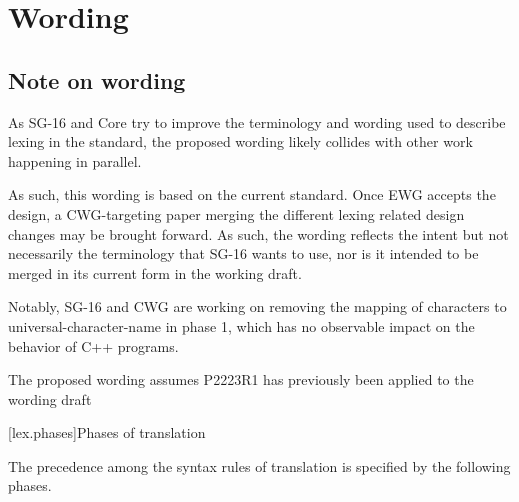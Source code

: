 \documentclass{wg21}
\begin{document}
\section{Wording}

\subsection{Note on wording}

As SG-16 and Core try to improve the terminology and wording used to describe lexing in the standard,
the proposed wording likely collides with other work happening in parallel.

As such, this wording is based on the current standard.
Once EWG accepts the design, a CWG-targeting paper merging the different lexing related design changes may be brought forward.
As such, the wording reflects the intent but not necessarily the terminology that SG-16 wants to use, nor is it intended to be merged in its current form in the working draft.

Notably, SG-16 and CWG are working on removing the mapping of characters to universal-character-name in phase 1, which has no observable impact on the behavior of C++ programs.

The proposed wording assumes P2223R1 has previously been applied to the wording draft


[lex.phases]{Phases of translation}%

\pnum
{}%
The precedence among the syntax rules of translation is specified by the
following phases.
\end{document}
